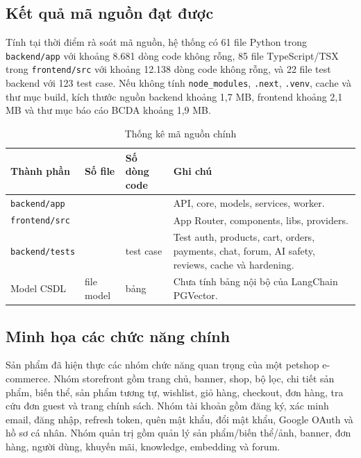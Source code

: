 \documentclass[../DoAn.tex]{subfiles}
\begin{document}
\subsection{Kết quả mã nguồn đạt được}
\label{subsection:4.3.2}

Tính tại thời điểm rà soát mã nguồn, hệ thống có 61 file Python trong \texttt{backend/app} với khoảng 8.681 dòng code không rỗng, 85 file TypeScript/TSX trong \texttt{frontend/src} với khoảng 12.138 dòng code không rỗng, và 22 file test backend với 123 test case. Nếu không tính \texttt{node\_modules}, \texttt{.next}, \texttt{.venv}, cache và thư mục build, kích thước nguồn backend khoảng 1,7 MB, frontend khoảng 2,1 MB và thư mục báo cáo BCDA khoảng 1,9 MB.

\begin{table}[H]
\centering
\small
\setlength{\tabcolsep}{3pt}
\renewcommand{\arraystretch}{1.2}
\caption{Thống kê mã nguồn chính}
\label{table:4.6}
\begin{tabular}{|>{\raggedright\arraybackslash}p{3.7cm}|>{\raggedright\arraybackslash}p{2.0cm}|>{\raggedright\arraybackslash}p{2.2cm}|>{\raggedright\arraybackslash}p{5.7cm}|}
\hline
\textbf{Thành phần} & \textbf{Số file} & \textbf{Số dòng code} & \textbf{Ghi chú} \\ \hline
\texttt{backend/app} & 61 & 8.681 & API, core, models, services, worker. \\ \hline
\texttt{frontend/src} & 85 & 12.138 & App Router, components, libs, providers. \\ \hline
\texttt{backend/tests} & 22 & 123 test case & Test auth, products, cart, orders, payments, chat, forum, AI safety, reviews, cache và hardening. \\ \hline
Model CSDL & 10 file model & 28 bảng & Chưa tính bảng nội bộ của LangChain PGVector. \\ \hline
\end{tabular}
\end{table}

\subsection{Minh họa các chức năng chính}
\label{subsection:4.3.3}

Sản phẩm đã hiện thực các nhóm chức năng quan trọng của một petshop e-commerce. Nhóm storefront gồm trang chủ, banner, shop, bộ lọc, chi tiết sản phẩm, biến thể, sản phẩm tương tự, wishlist, giỏ hàng, checkout, đơn hàng, tra cứu đơn guest và trang chính sách. Nhóm tài khoản gồm đăng ký, xác minh email, đăng nhập, refresh token, quên mật khẩu, đổi mật khẩu, Google OAuth và hồ sơ cá nhân. Nhóm quản trị gồm quản lý sản phẩm/biến thể/ảnh, banner, đơn hàng, người dùng, khuyến mãi, knowledge, embedding và forum.
\end{document}
